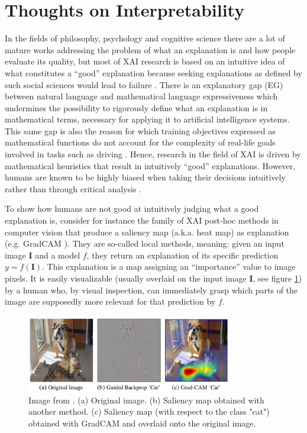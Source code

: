 \section{Thoughts on Interpretability}
In the fields of philosophy, psychology and cognitive science there are a lot of mature works addressing the problem of what an explanation is and how people evaluate its quality, but most of XAI research is based on an intuitive idea of what constitutes a “good” explanation because seeking explanations as defined by such social sciences would lead to failure \cite{Miller}.
There is an explanatory gap (EG) between natural language and mathematical language expressiveness which undermines the possibility to rigorously define what an explanation is in mathematical terms, necessary for applying it to artificial intelligence systems.
This same gap is also the reason for which training objectives expressed as mathematical functions do not account for the complexity of real-life goals involved in tasks such as driving \cite{Zablocki2022}.
Hence, research in the field of XAI is driven by mathematical heuristics that result in intuitively “good” explanations.
However, humans are known to be highly biased when taking their decisions intuitively rather than through critical analysis \cite{Kahneman}. 

To show how humans are not good at intuitively judging what a good explanation is, consider for instance the family of XAI post-hoc methods in computer vision that produce a saliency map (a.k.a. heat map) as explanation (e.g. GradCAM \cite{GradCAM}).
They are so-called local methods, meaning: given an input image $\mathbf{I}$ and a model $f$, they return an explanation of its specific prediction $y = f(\mathbf{I})$.
This explanation is a map assigning an “importance” value to image pixels.
It is easily visualizable (usually overlaid on the input image $\mathbf{I}$, see figure \ref{fig:grad_cam}) by a human who, by visual inspection, can immediately grasp which parts of the image are supposedly more relevant for that prediction by $f$.

\begin{figure}
    \centering
    \includegraphics[width=0.8\textwidth]{figs/grad_cam}
    \caption{
        Image from \cite{GradCAM}.
        (a) Original image.
        (b) Saliency map obtained with another method.
        (c) Saliency map (with respect to the class "cat") obtained with GradCAM and overlaid onto the original image.
        \label{fig:grad_cam}
    }
\end{figure}

